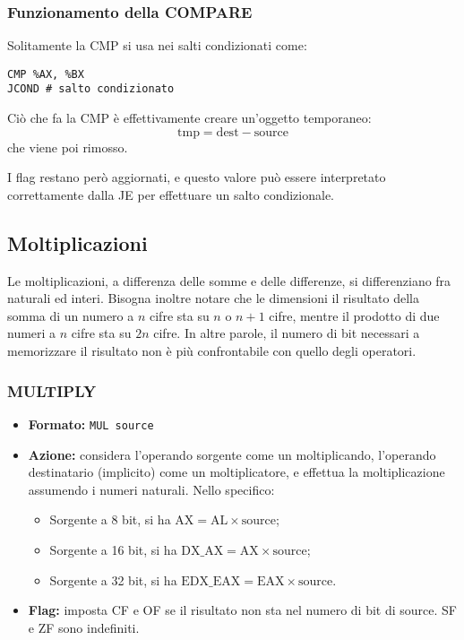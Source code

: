 \documentclass[a4paper,11pt]{article}
\begin{document}
\subsubsection{Funzionamento della COMPARE}
Solitamente la CMP si usa nei salti condizionati come:
\begin{lstlisting}[language=assembler,style=codestyle]	
CMP %AX, %BX
JCOND # salto condizionato
\end{lstlisting}
\noindent
Ciò che fa la CMP è effettivamente creare un'oggetto temporaneo:
$$
\text{tmp} = \text{dest} - \text{source}
$$
che viene poi rimosso.

I flag restano però aggiornati, e questo valore può essere interpretato correttamente dalla JE per effettuare un salto condizionale.


\subsection{Moltiplicazioni}
Le moltiplicazioni, a differenza delle somme e delle differenze, si differenziano fra naturali ed interi.
Bisogna inoltre notare che le dimensioni il risultato della somma di un numero a $n$ cifre sta su $n$ o $n+1$ cifre, mentre il prodotto di due numeri a $n$ cifre sta su $2n$ cifre.
In altre parole, il numero di bit necessari a memorizzare il risultato non è più confrontabile con quello degli operatori.


\subsubsection{MULTIPLY}
\begin{itemize}
	\item \textbf{Formato:} \lstinline|MUL source|
	\item \textbf{Azione:} considera l'operando sorgente come un moltiplicando, l'operando destinatario (implicito) come un moltiplicatore, e effettua la moltiplicazione assumendo i numeri naturali. Nello specifico:
	\begin{itemize}
		\item Sorgente a 8 bit, si ha $\text{AX} = \text{AL} \times \text{source}$;
		\item Sorgente a 16 bit, si ha $\text{DX}\_\text{AX} = \text{AX} \times \text{source}$;
		\item Sorgente a 32 bit, si ha $\text{EDX}\_\text{EAX} = \text{EAX} \times \text{source}$.
	\end{itemize}
	\item \textbf{Flag:} imposta CF e OF se il risultato non sta nel numero di bit di source. SF e ZF sono indefiniti.
\end{itemize}
\end{document}
